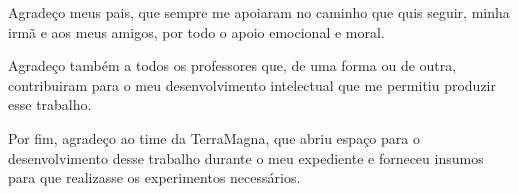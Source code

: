 Agradeço meus pais, que sempre me apoiaram no caminho que quis seguir, minha irmã
e aos meus amigos, por todo o apoio emocional e moral.

Agradeço também a todos os professores que, de uma forma ou de outra, contribuiram
para o meu desenvolvimento intelectual que me permitiu produzir esse trabalho.

Por fim, agradeço ao time da TerraMagna, que abriu espaço para o desenvolvimento desse
trabalho durante o meu expediente e forneceu insumos para que realizasse os experimentos
necessários.
